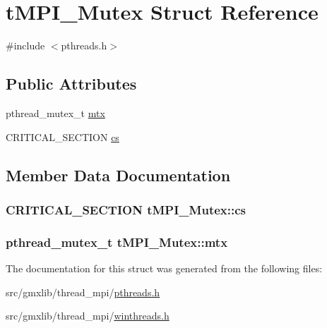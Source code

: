 \hypertarget{structtMPI__Mutex}{\section{t\-M\-P\-I\-\_\-\-Mutex \-Struct \-Reference}
\label{structtMPI__Mutex}
}


{\ttfamily \#include $<$pthreads.\-h$>$}

\subsection*{\-Public \-Attributes}
\begin{DoxyCompactItemize}
\item 
pthread\-\_\-mutex\-\_\-t \hyperlink{structtMPI__Mutex_a07c83fb7e9f1a2d01a4c416b4d0996ab}{mtx}
\item 
\-C\-R\-I\-T\-I\-C\-A\-L\-\_\-\-S\-E\-C\-T\-I\-O\-N \hyperlink{structtMPI__Mutex_a6e0420c020ae6f39db7e656a8e1c5895}{cs}
\end{DoxyCompactItemize}


\subsection{\-Member \-Data \-Documentation}
\hypertarget{structtMPI__Mutex_a6e0420c020ae6f39db7e656a8e1c5895}{
\subsubsection[{cs}]{\setlength{\rightskip}{0pt plus 5cm}\-C\-R\-I\-T\-I\-C\-A\-L\-\_\-\-S\-E\-C\-T\-I\-O\-N {\bf t\-M\-P\-I\-\_\-\-Mutex\-::cs}}}\label{structtMPI__Mutex_a6e0420c020ae6f39db7e656a8e1c5895}
\hypertarget{structtMPI__Mutex_a07c83fb7e9f1a2d01a4c416b4d0996ab}{
\subsubsection[{mtx}]{\setlength{\rightskip}{0pt plus 5cm}pthread\-\_\-mutex\-\_\-t {\bf t\-M\-P\-I\-\_\-\-Mutex\-::mtx}}}\label{structtMPI__Mutex_a07c83fb7e9f1a2d01a4c416b4d0996ab}


\-The documentation for this struct was generated from the following files\-:\begin{DoxyCompactItemize}
\item 
src/gmxlib/thread\-\_\-mpi/\hyperlink{pthreads_8h}{pthreads.\-h}\item 
src/gmxlib/thread\-\_\-mpi/\hyperlink{winthreads_8h}{winthreads.\-h}\end{DoxyCompactItemize}
